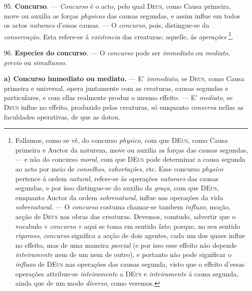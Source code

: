  95. \textbf{Concurso}. --- \emph{Concurso} é o acto, pelo qual \textsc{Deus}, como Causa primeira, move ou auxilia as forças \emph{physicas} das causas segundas, e assim influe em todos os actos \emph{naturaes} d'essas causas. --- O \emph{concurso}, pois, distingue-se da \emph{conservação}. Esta refere-se á \emph{existencia} das creaturas; aquelle, ás \emph{operações} \footnote{Fallamos, como se vê, do concurso \emph{physico}, com que \textsc{DEus}, como Causa primeira e Auctor da natureza, move ou auxilia as forças das causas segundas, --- e não do concurso \emph{moral}, com que \textsc{DEus} pode determinar a causa segunda ao acto por meio de \emph{conselhos}, \emph{exhortações}, etc. Esse concurso \emph{physico} pertence á ordem \emph{natural}, refere-se ás operações \emph{naturaes} das causas segundas, e por isso distingue-se do auxilio da \emph{graça}, com que \textsc{DEus}, emquanto Auctor da ordem \emph{sobrenatural}, influe nas operações da vida \emph{sobrenatural}. --- O \emph{concurso} costuma chamar-se tambem \emph{influxo}, moção, acção de \textsc{Deus} nas obras das creaturas. Devemos, comtudo, advertir que o vocabulo « \emph{concurso} » aqui se toma em sentido \emph{lato}; porque, no seu sentido \emph{rigoroso}, \emph{concurso} significa a acção de dois agentes, cada um dos quaes influe no effeito, mas de uma maneira \emph{parcial} (e por isso esse effeito não depende \emph{inteiramente} nem de um nem de outro), e portanto não pode significar o \emph{influxo} de \textsc{DEus} nas operações das causas segunda, visto que o effeito d'essas operações attribue-se \emph{inteiramente} a \textsc{DEus} e \emph{inteiramente} á causa segunda, ainda que de um modo \emph{diverso}, como veremos.}.

96. \textbf{Especies do concurso}. --- O \emph{concurso} pode ser \emph{immediato} ou \emph{mediato}, \emph{previo} ou \emph{simultaneo}.

\textbf{a) Concurso immediato ou mediato.} --- E' \emph{immediato}, se \textsc{Deus}, como Causa primeira e universal, opera juntamente com as creaturas, causas segundas e particulares, e com ellas realmente produz o mesmo effeito. --- E' \emph{mediato}, se \textsc{Deus} influe no effeito, produzido pelas creaturas, só emquanto \emph{conserva} nellas as faculdades operativas, de que as dotou.

